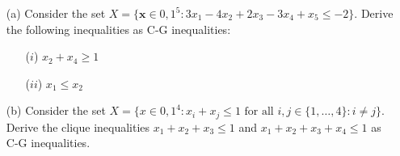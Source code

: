 \begin{enumerate}
\item[(a)] Consider the set $X = \{\mathbf{x} \in {0,1}^5 : 3x_1 - 4x_2 + 2x_3 - 3x_4 + x_5 \leq -2 \}$. Derive the following inequalities as C-G inequalities:
\begin{enumerate}
\item[($i$)] $x_2 + x_4 \geq 1$
\item[($ii$)] $x_1 \leq x_2$
\end{enumerate}
\item[(b)] Consider the set $X = \{x \in {0,1}^4 : x_i + x_j \leq 1 \textrm{ for all } i,j\in \{1,\dots,4\} : i\neq j\}$. Derive the clique inequalities $x_1 + x_2 + x_3 \leq 1$ and $x_1+ x_2 + x_3 + x_4 \leq 1$ as C-G inequalities.
\end{enumerate}

